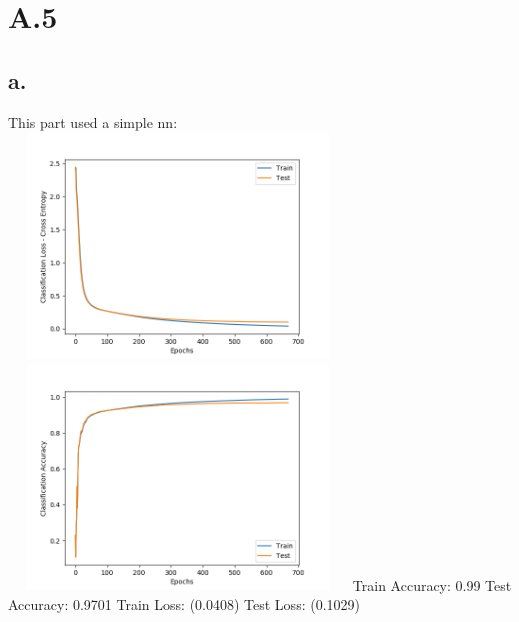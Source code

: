 \documentclass{article}
\begin{document}
\section*{A.5}
\subsection*{a.}
This part used a simple nn: \newline
\includegraphics[width=9cm, height=6cm]{plots/A5a_2.png} 
\includegraphics[width=9cm, height=6cm]{plots/A5a.png} \newline
Train Accuracy:  0.99 \newline
Test Accuracy:  0.9701\newline
Train Loss:  (0.0408)\newline
Test Loss:  (0.1029)\newline
\end{document}
